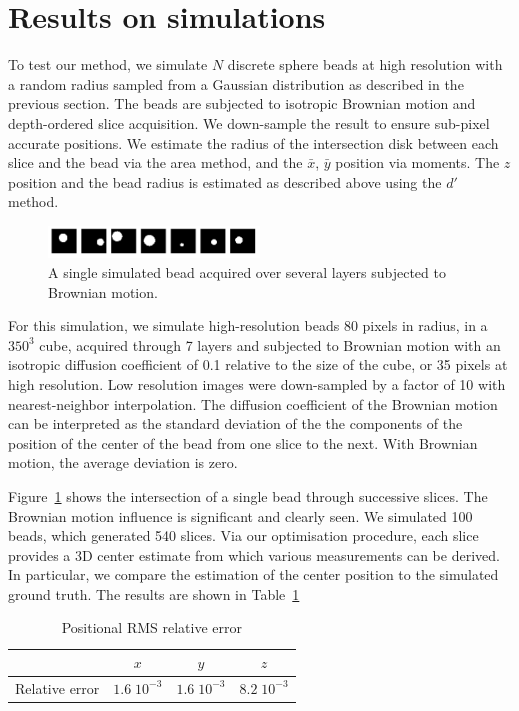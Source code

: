 \documentclass{llncs}
\begin{document}
\section{Results on simulations}
To test our method, we simulate $N$ discrete sphere beads at high resolution with a random radius sampled from a Gaussian distribution as described in the previous section. The beads are subjected to isotropic Brownian motion and depth-ordered slice acquisition. We down-sample the result to ensure sub-pixel accurate positions. We estimate the radius of the intersection disk between each slice and the bead via the area method, and the $\bar{x}$, $\bar{y}$ position via moments. 
The $z$ position and the bead radius is estimated as described above using the $d'$ method.

\begin{figure}
\centering
\includegraphics[width=0.5\textwidth]{images/simulated.png}
\caption{A single simulated bead acquired over several layers subjected to Brownian motion.}
\label{fig:simulated_beads}
\end{figure}

For this simulation, we simulate high-resolution beads 80 pixels in radius, in a $350^3$ cube, acquired through 7 layers and subjected to  Brownian motion with an isotropic diffusion coefficient of 0.1 relative to the size of the cube, or 35 pixels at high resolution. Low resolution images were down-sampled by a factor of 10 with nearest-neighbor interpolation. The diffusion coefficient of the Brownian motion can be interpreted as the standard deviation of the the components of the position of the center of the bead from one slice to the next. With Brownian motion, the average deviation is zero.

Figure~\ref{fig:simulated_beads} shows the intersection of a single bead through successive slices. The Brownian motion influence is significant and clearly seen. We simulated 100 beads, which generated 540 slices. Via our optimisation procedure, each slice provides a 3D center estimate from which various measurements can be derived. In particular, we compare the estimation of the center position to the simulated ground truth. The results are shown in Table~\ref{tab:rel_error}

\begin{table}[htb]
\centering
\caption{Positional RMS relative error}
\begin{tabular}{|c|c|c|c|}\hline
                & $x$            & $y$            & $z$ \\\hline
Relative error  & $1.6\;10^{-3}$ & $1.6\;10^{-3}$ & $8.2\;10^{-3}$ \\\hline
\end{tabular}
\label{tab:rel_error}
\end{table}
\end{document}
